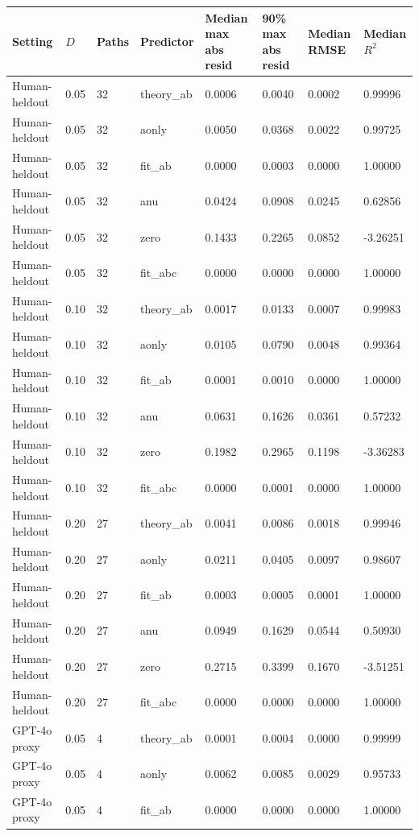 \begin{tabular}{llllllll}
\toprule
Setting & $D$ & Paths & Predictor & Median max abs resid & 90\% max abs resid & Median RMSE & Median $R^2$ \\
\midrule
Human-heldout & 0.05 & 32 & theory\_ab & 0.0006 & 0.0040 & 0.0002 & 0.99996 \\
Human-heldout & 0.05 & 32 & aonly & 0.0050 & 0.0368 & 0.0022 & 0.99725 \\
Human-heldout & 0.05 & 32 & fit\_ab & 0.0000 & 0.0003 & 0.0000 & 1.00000 \\
Human-heldout & 0.05 & 32 & anu & 0.0424 & 0.0908 & 0.0245 & 0.62856 \\
Human-heldout & 0.05 & 32 & zero & 0.1433 & 0.2265 & 0.0852 & -3.26251 \\
Human-heldout & 0.05 & 32 & fit\_abc & 0.0000 & 0.0000 & 0.0000 & 1.00000 \\
Human-heldout & 0.10 & 32 & theory\_ab & 0.0017 & 0.0133 & 0.0007 & 0.99983 \\
Human-heldout & 0.10 & 32 & aonly & 0.0105 & 0.0790 & 0.0048 & 0.99364 \\
Human-heldout & 0.10 & 32 & fit\_ab & 0.0001 & 0.0010 & 0.0000 & 1.00000 \\
Human-heldout & 0.10 & 32 & anu & 0.0631 & 0.1626 & 0.0361 & 0.57232 \\
Human-heldout & 0.10 & 32 & zero & 0.1982 & 0.2965 & 0.1198 & -3.36283 \\
Human-heldout & 0.10 & 32 & fit\_abc & 0.0000 & 0.0001 & 0.0000 & 1.00000 \\
Human-heldout & 0.20 & 27 & theory\_ab & 0.0041 & 0.0086 & 0.0018 & 0.99946 \\
Human-heldout & 0.20 & 27 & aonly & 0.0211 & 0.0405 & 0.0097 & 0.98607 \\
Human-heldout & 0.20 & 27 & fit\_ab & 0.0003 & 0.0005 & 0.0001 & 1.00000 \\
Human-heldout & 0.20 & 27 & anu & 0.0949 & 0.1629 & 0.0544 & 0.50930 \\
Human-heldout & 0.20 & 27 & zero & 0.2715 & 0.3399 & 0.1670 & -3.51251 \\
Human-heldout & 0.20 & 27 & fit\_abc & 0.0000 & 0.0000 & 0.0000 & 1.00000 \\
GPT-4o proxy & 0.05 & 4 & theory\_ab & 0.0001 & 0.0004 & 0.0000 & 0.99999 \\
GPT-4o proxy & 0.05 & 4 & aonly & 0.0062 & 0.0085 & 0.0029 & 0.95733 \\
GPT-4o proxy & 0.05 & 4 & fit\_ab & 0.0000 & 0.0000 & 0.0000 & 1.00000 \\

\end{tabular}

